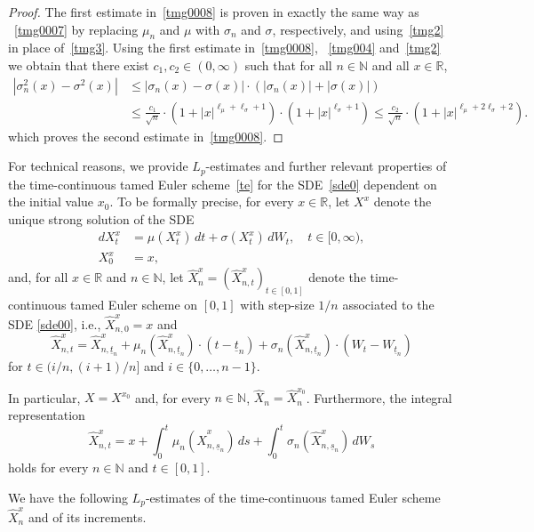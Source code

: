 \documentclass[11pt]{amsart}
\newcommand{\R}{{\mathbb R}}
\newcommand{\N}{{\mathbb N}}
\newcommand{\eul}{{\widehat X}}
\newcommand{\usn}{\underline {s}_n}
\newcommand{\utn}{\underline {t}_n}
\theoremstyle{plain}
\theoremstyle{definition}
\begin{document}
\begin{proof}
The first estimate in~\eqref{tmg0008} is proven in exactly the same way as ~\eqref{tmg0007} by replacing $\mu_n$ and $\mu$ with $\sigma_n$ and $\sigma$, respectively, and using~\eqref{tmg2} in place of~\eqref{tmg3}. Using the first estimate in~\eqref{tmg0008}, ~\eqref{tmg004} and~\eqref{tmg2} we obtain that there exist $c_1,c_2\in (0,\infty)$ such that for all $n\in\N$ and all $x\in \R$,
\begin{align*}
	|\sigma^2_n(x) -\sigma^2(x)|&  \le 	|\sigma_n(x) -\sigma(x)| \cdot(	|\sigma_n(x)|+|\sigma(x)|)\\
	& \le \frac{c_1}{\sqrt{n}}\cdot  (1+|x|^{\ell_\mu+\ell_\sigma+1}) \cdot (1+ |x|^{\ell_\sigma +1}) \le   \frac{c_2}{\sqrt{n}} \cdot   (1+ |x|^{\ell_\mu+2\ell_\sigma + 2}).
\end{align*}
which proves the second estimate  in~\eqref{tmg0008}.
\end{proof}


For technical reasons, we provide $L_p$-estimates and  further relevant properties
of the time-continuous tamed Euler scheme~\eqref{te} for the SDE~\eqref{sde0}
 dependent on the initial value $x_0$. To be formally precise, for every $x\in\R$, let
$X^x$ denote the unique strong solution of the SDE
\begin{equation}\label{sde00}
\begin{aligned}
dX^x_t & = \mu(X^x_t) \, dt + \sigma(X^x_t) \, dW_t, \quad t\in [0,\infty),\\
X^x_0 & = x,
\end{aligned}
\end{equation}
and, for all $x\in\R$ and $n\in\N$, let $\eul_{n}^x=(\eul_{n,t}^x)_{t\in[0,1]}$  denote the time-continuous tamed Euler scheme on $[0,1]$ with step-size $1/n$ associated to the SDE \eqref{sde00}, i.e., $\eul_{n,0}^x=x$ and
\[
\eul_{n,t}^{x}=\eul_{n,\utn}^{x}+\mu_n(\eul_{n,\utn}^{x})\cdot (t-\utn)+\sigma_n(\eul_{n,\utn}^{x})\cdot (W_t-W_{\utn})
\]
for $t\in (i/n,(i+1)/n]$ and $i\in\{0,\ldots,n-1\}$.

In particular, $X=X^{x_0}$ and, for every $n\in\N$,  $\widehat X_n = \eul_{n}^{x_0}$. Furthermore,   the integral representation
\begin{equation}\label{intrep}
\eul_{n,t}^{x}=x+\int_0^t \mu_n(\eul_{n,\usn}^{x})\, ds+\int_0^t\sigma_n(\eul_{n,\usn}^{x})\,dW_s
\end{equation}
holds for every $n\in\N$ and $t\in[0,1]$.


We have the following $L_p$-estimates  of  the time-continuous tamed Euler scheme $\eul_{n}^{x}$ and of its increments.
\end{document}
